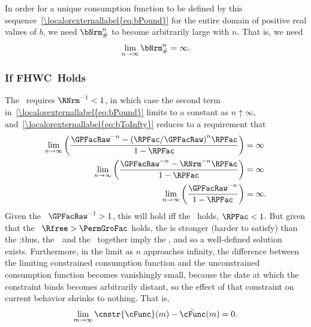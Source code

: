 \documentclass[\econtexRoot/BufferStockTheory]{subfiles}
\begin{document}
In order for a unique consumption function to be defined by this sequence~\eqref{\localorexternallabel{eq:bPound}} for the entire domain of positive real values of $b$, we need $\bNrm_{\#}^{n}$ to become arbitrarily large with $n$.  That is, we need
\begin{equation}\begin{gathered}\begin{aligned}
  \lim_{n \rightarrow \infty} \bNrm_{\#}^{n} = \infty. \label{eq:bToInfty}
\end{aligned}\end{gathered}\end{equation}

\subsubsection{If {FHWC}~Holds}
The \FHWC~requires $\RNrm^{-1} < 1$, in which case the second term in~\eqref{\localorexternallabel{eq:bPound}} limits to a constant as $n \uparrow \infty$, and~\eqref{\localorexternallabel{eq:bToInfty}} reduces to a requirement that
\begin{eqnarray*}
  \lim_{n \rightarrow \infty} \left(\frac{\GPFacRaw^{-n}-{(\RPFac/\GPFacRaw)}^{n}\RPFac}{1-\RPFac}\right)  & = \infty
  \\  \lim_{n \rightarrow \infty} \left(\frac{\GPFacRaw^{-n}-\RNrm^{-n}\RPFac}{1-\RPFac}\right)  & = \infty
  \\  \lim_{n \rightarrow \infty} \left(\frac{\GPFacRaw^{-n}}{1-\RPFac}\right)  & = \infty.
\end{eqnarray*}
Given the \GICRaw~$\GPFacRaw^{-1}>1$, this will hold iff the \RIC~holds, $\RPFac < 1$.  But given that the \FHWC~$\Rfree > \PermGroFac$ holds, the {\GICRaw} is stronger (harder to satisfy) than the \RIC;\@ thus, the~\FHWC~and the \GICRaw~together imply the \RIC, and so a well-defined solution exists.  Furthermore, in the limit as $n$ approaches infinity, the difference between the limiting constrained consumption function and the unconstrained consumption function becomes vanishingly small, because the date at which the constraint binds becomes arbitrarily distant, so the effect of that constraint on current behavior shrinks to nothing.  That is,
\begin{equation}\begin{gathered}\begin{aligned}
  \lim_{m \rightarrow \infty}\cnstr{\cFunc}(m) - \bar{\cFunc}(m) = 0.
\end{aligned}\end{gathered}\end{equation}
\end{document}
